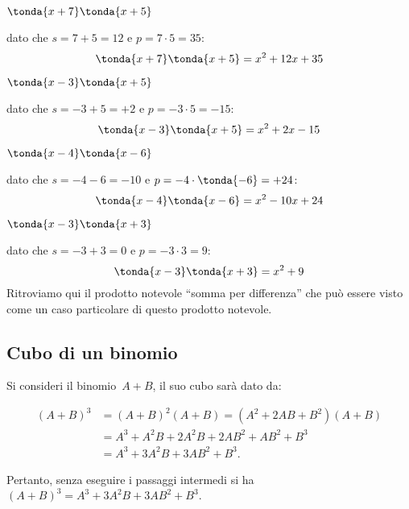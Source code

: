 \begin{exrig}
 \begin{esempio}
\(\tonda{x+7} \tonda{x+5}\)

dato che \(s=7+5=12\) e \(p=7 \cdot 5=35\):
\[\tonda{x+7} \tonda{x+5}=x^2+12x+35\]
 \end{esempio}

 \begin{esempio}
\(\tonda{x-3} \tonda{x+5}\)

dato che \(s=-3+5=+2\) e \(p=-3 \cdot 5=-15\):
\[\tonda{x-3} \tonda{x+5}=x^2+2x-15\]
 \end{esempio}

 \begin{esempio}
\(\tonda{x-4} \tonda{x-6}\)

dato che \(s=-4-6=-10\) e \(p=-4 \cdot \tonda{-6}=+24\):
\[\tonda{x-4} \tonda{x-6}=x^2-10x+24\]
 \end{esempio}

 \begin{esempio}
\(\tonda{x-3} \tonda{x+3}\)

dato che \(s=-3+3=0\) e \(p=-3 \cdot 3=9\):
\[\tonda{x-3} \tonda{x+3}=x^2+9\]
Ritroviamo qui il prodotto notevole ``somma per differenza'' che può essere 
visto come un caso particolare di questo prodotto notevole.
 \end{esempio}

\end{exrig}




\subsection{Cubo di un binomio}
\label{subsec:11_prodnot_cubo}

Si consideri il binomio~\(A+B\), il suo cubo sarà dato da:

\begin{align*}
\left(A+B\right)^{3}&=\left(A+B\right)^{2}\left(A+B\right)=\left(A^{2}+2{AB}
+B^{2}\right)\left(A+B\right)\\
&=A^{3}+A^{2}B+2A^{2}B+2{AB}^{2}+{AB}^{2}+B^{3}\\
&=A^{3}+3A^{2}B+3{AB}^{2}+B^{3}.
\end{align*}

Pertanto, senza eseguire i passaggi intermedi si ha
\(\left(A+B\right)^{3}=A^{3}+3A^{2}B+3{AB}^{2}+B^{3}\).

